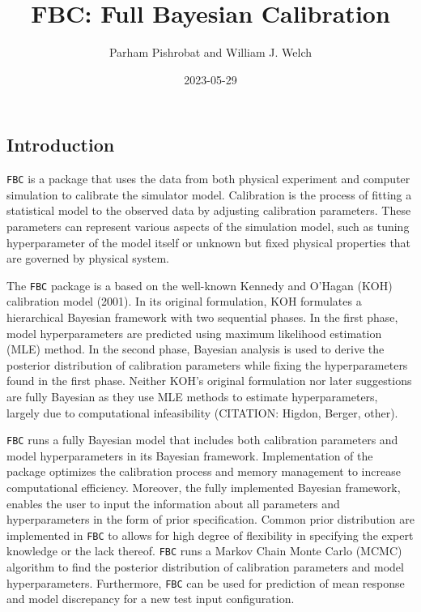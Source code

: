 \documentclass[
]{article}
\title{FBC: Full Bayesian Calibration}
\author{Parham Pishrobat and William J. Welch}
\date{2023-05-29}
\begin{document}
\maketitle

\hypertarget{introduction}{%
\subsection{Introduction}\label{introduction}}

\texttt{FBC} is a package that uses the data from both physical
experiment and computer simulation to calibrate the simulator model.
Calibration is the process of fitting a statistical model to the
observed data by adjusting calibration parameters. These parameters can
represent various aspects of the simulation model, such as tuning
hyperparameter of the model itself or unknown but fixed physical
properties that are governed by physical system.

The \texttt{FBC} package is a based on the well-known Kennedy and
O'Hagan (KOH) calibration model (2001). In its original formulation, KOH
formulates a hierarchical Bayesian framework with two sequential phases.
In the first phase, model hyperparameters are predicted using maximum
likelihood estimation (MLE) method. In the second phase, Bayesian
analysis is used to derive the posterior distribution of calibration
parameters while fixing the hyperparameters found in the first phase.
Neither KOH's original formulation nor later suggestions are fully
Bayesian as they use MLE methods to estimate hyperparameters, largely
due to computational infeasibility (CITATION: Higdon, Berger, other).

\texttt{FBC} runs a fully Bayesian model that includes both calibration
parameters and model hyperparameters in its Bayesian framework.
Implementation of the package optimizes the calibration process and
memory management to increase computational efficiency. Moreover, the
fully implemented Bayesian framework, enables the user to input the
information about all parameters and hyperparameters in the form of
prior specification. Common prior distribution are implemented in
\texttt{FBC} to allows for high degree of flexibility in specifying the
expert knowledge or the lack thereof. \texttt{FBC} runs a Markov Chain
Monte Carlo (MCMC) algorithm to find the posterior distribution of
calibration parameters and model hyperparameters. Furthermore,
\texttt{FBC} can be used for prediction of mean response and model
discrepancy for a new test input configuration.
\end{document}
